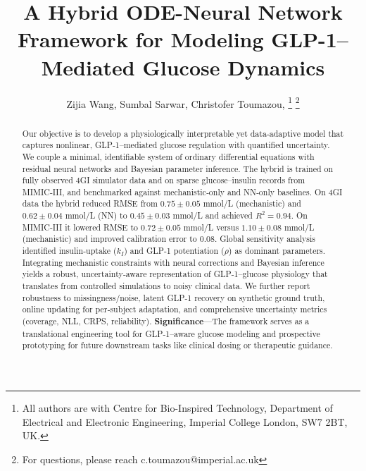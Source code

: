 \documentclass[9pt,shortpaper,twoside,web]{ieeecolor}
\begin{document}
\title{A Hybrid ODE-Neural Network Framework for Modeling GLP-1–Mediated Glucose Dynamics}

\author{Zijia Wang, Sumbal Sarwar, Christofer Toumazou, 
\thanks{All authors are with Centre for Bio-Inspired Technology, Department of Electrical and Electronic Engineering, Imperial College London, SW7 2BT, UK.}
\thanks{For questions, please reach c.toumazou@imperial.ac.uk}}

\maketitle

\begin{abstract}
Our objective is to develop a physiologically interpretable yet data‐adaptive model that captures nonlinear, GLP‑1–mediated glucose regulation with quantified uncertainty. We couple a minimal, identifiable system of ordinary differential equations with residual neural networks and Bayesian parameter inference. The hybrid is trained on fully observed 4GI simulator data and on sparse glucose–insulin records from MIMIC‑III, and benchmarked against mechanistic‐only and NN‐only baselines. On 4GI data the hybrid reduced RMSE from $0.75\pm0.05$ mmol/L (mechanistic) and $0.62\pm0.04$ mmol/L (NN) to $0.45\pm0.03$ mmol/L and achieved $R^2=0.94$. On MIMIC‑III it lowered RMSE to $0.72\pm0.05$ mmol/L versus $1.10\pm0.08$ mmol/L (mechanistic) and improved calibration error to $0.08$. Global sensitivity analysis identified insulin‐uptake ($k_I$) and GLP‑1 potentiation ($\rho$) as dominant parameters. Integrating mechanistic constraints with neural corrections and Bayesian inference yields a robust, uncertainty‑aware representation of GLP‑1–glucose physiology that translates from controlled simulations to noisy clinical data. We further report robustness to missingness/noise, latent GLP‑1 recovery on synthetic ground truth, online updating for per‑subject adaptation, and comprehensive uncertainty metrics (coverage, NLL, CRPS, reliability).
\textbf{Significance}—The framework serves as a translational engineering tool for GLP‑1–aware glucose modeling and prospective prototyping for future downstream tasks like clinical dosing or therapeutic guidance.
\end{abstract}
\end{document}
